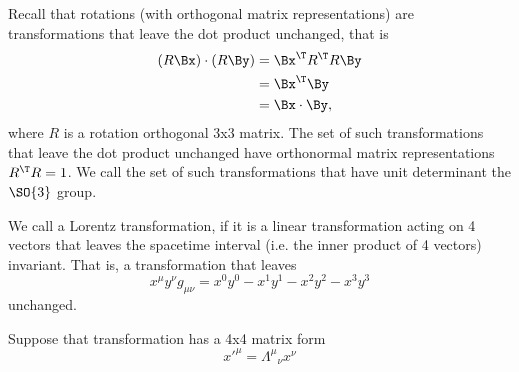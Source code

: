 Recall that rotations (with orthogonal matrix representations) are transformations that leave the dot product unchanged, that is
\begin{equation}\label{eqn:qftLecture2:480}
\begin{aligned}
(R \Bx) \cdot (R \By)
&= \Bx^\T R^\T R \By \\
&= \Bx^\T \By \\
&= \Bx \cdot \By,
\end{aligned}
\end{equation}
%
where \( R \) is a rotation orthogonal 3x3 matrix.  The set of such transformations that leave the dot product unchanged have orthonormal matrix representations \( R^\T R = 1 \).  We call the set of such transformations that have unit determinant the \(\SO{3}\) group.

We call a Lorentz transformation, if it is a linear transformation acting on 4 vectors that leaves the spacetime interval (i.e. the inner product of 4 vectors) invariant.  That is, a transformation that leaves
\begin{equation}\label{eqn:qftLecture2:500}
x^\mu y^\nu g_{\mu\nu} = x^0 y^0 - x^1 y^1 - x^2 y^2 - x^3 y^3
\end{equation}
unchanged.

Suppose that transformation has a 4x4 matrix form
\begin{equation}\label{eqn:qftLecture2:520}
{x'}^\mu = {\Lambda^\mu}_\nu x^\nu
\end{equation}

